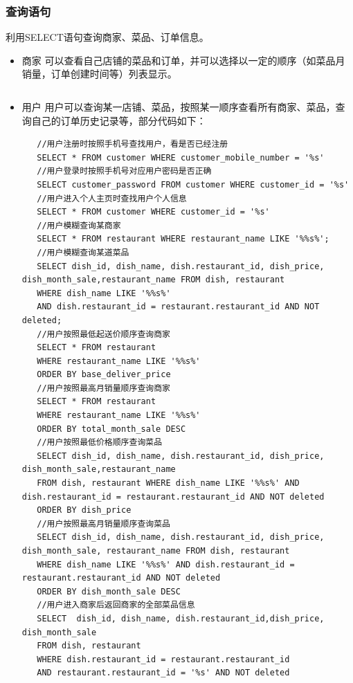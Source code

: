 \documentclass[12pt, oneside,a4paper]{article}
\begin{document}
\subsubsection{查询语句}
   利用SELECT语句查询商家、菜品、订单信息。
  \begin{itemize}
   \item 商家
     可以查看自己店铺的菜品和订单，并可以选择以一定的顺序（如菜品月销量，订单创建时间等）列表显示。
    \begin{lstlisting}

    \end{lstlisting}
   \item 用户
     用户可以查询某一店铺、菜品，按照某一顺序查看所有商家、菜品，查询自己的订单历史记录等，部分代码如下：
    \begin{lstlisting}
   //用户注册时按照手机号查找用户，看是否已经注册
   SELECT * FROM customer WHERE customer_mobile_number = '%s'
   //用户登录时按照手机号对应用户密码是否正确
   SELECT customer_password FROM customer WHERE customer_id = '%s'
   //用户进入个人主页时查找用户个人信息
   SELECT * FROM customer WHERE customer_id = '%s'
   //用户模糊查询某商家
   SELECT * FROM restaurant WHERE restaurant_name LIKE '%%s%';
   //用户模糊查询某道菜品
   SELECT dish_id, dish_name, dish.restaurant_id, dish_price, dish_month_sale,restaurant_name FROM dish, restaurant
   WHERE dish_name LIKE '%%s%'
   AND dish.restaurant_id = restaurant.restaurant_id AND NOT deleted;
   //用户按照最低起送价顺序查询商家
   SELECT * FROM restaurant
   WHERE restaurant_name LIKE '%%s%'
   ORDER BY base_deliver_price
   //用户按照最高月销量顺序查询商家
   SELECT * FROM restaurant
   WHERE restaurant_name LIKE '%%s%'
   ORDER BY total_month_sale DESC
   //用户按照最低价格顺序查询菜品
   SELECT dish_id, dish_name, dish.restaurant_id, dish_price, dish_month_sale,restaurant_name
   FROM dish, restaurant WHERE dish_name LIKE '%%s%' AND dish.restaurant_id = restaurant.restaurant_id AND NOT deleted
   ORDER BY dish_price
   //用户按照最高月销量顺序查询菜品
   SELECT dish_id, dish_name, dish.restaurant_id, dish_price, dish_month_sale, restaurant_name FROM dish, restaurant
   WHERE dish_name LIKE '%%s%' AND dish.restaurant_id = restaurant.restaurant_id AND NOT deleted
   ORDER BY dish_month_sale DESC
   //用户进入商家后返回商家的全部菜品信息
   SELECT  dish_id, dish_name, dish.restaurant_id,dish_price, dish_month_sale    
   FROM dish, restaurant
   WHERE dish.restaurant_id = restaurant.restaurant_id
   AND restaurant.restaurant_id = '%s' AND NOT deleted
    \end{lstlisting}
  \end{itemize}
\end{document}
